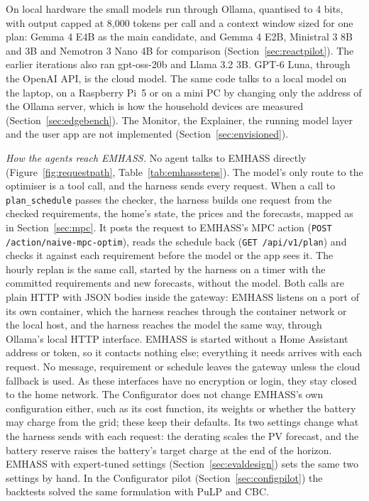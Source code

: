 On local hardware the small models run through Ollama, quantised to 4
bits, with output capped at 8,000 tokens per call and a context window
sized for one plan: Gemma 4 E4B as the main candidate, and Gemma 4 E2B,
Ministral 3 8B and 3B and Nemotron 3 Nano 4B for comparison
(Section~\ref{sec:reactpilot}). The earlier iterations also ran
gpt-oss-20b and Llama 3.2 3B.
GPT-6 Luna, through the OpenAI API, is the cloud model. The same code
talks to a local model on the laptop, on a
Raspberry Pi~5 or on a mini PC by changing only the address of the
Ollama server, which is how the household devices are measured
(Section~\ref{sec:edgebench}). The Monitor, the Explainer, the running
model layer and the user app are not implemented
(Section~\ref{sec:envisioned}).

\textit{How the agents reach EMHASS.} No agent talks to EMHASS
directly (Figure~\ref{fig:requestpath}, Table~\ref{tab:emhasssteps}). The model's only route to the optimiser is a tool call, and
the harness sends every request. When a call to \texttt{plan\_schedule}
passes the checker, the harness builds one request from the checked
requirements, the home's state, the prices and the forecasts, mapped as
in Section~\ref{sec:mpc}. It posts the request to EMHASS's MPC action
(\texttt{POST /action/naive-mpc-optim}), reads the schedule back
(\texttt{GET /api/v1/plan}) and checks it against each requirement
before the model or the app sees it. The hourly replan is the same
call, started by the harness on a timer with the committed requirements
and new forecasts, without the model. Both calls are plain HTTP with
JSON bodies inside the gateway: EMHASS listens on a port of its own
container, which the harness reaches through the container network or
the local host, and the harness reaches the model the same way, through
Ollama's local HTTP interface. EMHASS is started without a Home
Assistant address or token, so it contacts nothing else; everything it
needs arrives with each request. No message, requirement or schedule
leaves the gateway unless the cloud fallback is used. As these interfaces have no encryption or
login, they stay closed to the home network. The Configurator does not change
EMHASS's own configuration either, such as its cost function, its
weights or whether the battery may charge from the grid; these keep
their defaults. Its two settings change what the harness sends with
each request: the derating scales the PV forecast, and the battery
reserve raises the battery's target charge at the end of the horizon.
EMHASS with expert-tuned settings (Section~\ref{sec:evaldesign}) sets
the same two settings by hand. In the Configurator pilot
(Section~\ref{sec:configpilot}) the backtests solved the same
formulation with PuLP and CBC.

